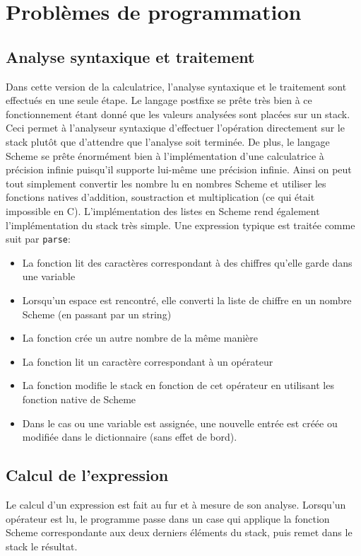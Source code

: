\documentclass{article}
\title{IFT2035 A2016 - Travail pratique #2}
\author{Philippe Caron}
\date{\today}
\begin{document}
\section{Problèmes de programmation}
\subsection{Analyse syntaxique et traitement}
Dans cette version de la calculatrice, l'analyse syntaxique et le traitement sont effectués en une seule étape. Le langage postfixe se prête très bien à ce fonctionnement étant donné que les valeurs analysées sont placées sur un stack. Ceci permet à l'analyseur syntaxique d'effectuer l'opération directement sur le stack plutôt que d'attendre que l'analyse soit terminée. De plus, le langage Scheme se prête énormément bien à l'implémentation d'une calculatrice à précision infinie puisqu'il supporte lui-même une précision infinie. Ainsi on peut tout simplement convertir les nombre lu en nombres Scheme et utiliser les fonctions natives d'addition, soustraction et multiplication (ce qui était impossible en C). L'implémentation des listes en Scheme rend également l'implémentation du stack très simple. Une expression typique est traitée comme suit par \texttt{parse}:
\begin{itemize}
\item La fonction lit des caractères correspondant à des chiffres qu'elle garde dans une variable
\item Lorsqu'un espace est rencontré, elle converti la liste de chiffre en un nombre Scheme (en passant par un string)
\item La fonction crée un autre nombre de la même manière
\item La fonction lit un caractère correspondant à un opérateur
\item La fonction modifie le stack en fonction de cet opérateur en utilisant les fonction native de Scheme
\item Dans le cas ou une variable est assignée, une nouvelle entrée est créée ou modifiée dans le dictionnaire (sans effet de bord).
\end{itemize}

\subsection{Calcul de l'expression}
Le calcul d'un expression est fait au fur et à mesure de son analyse. Lorsqu'un opérateur est lu, le programme passe dans un case qui applique la fonction Scheme correspondante aux deux derniers éléments du stack, puis remet dans le stack le résultat.
\end{document}
